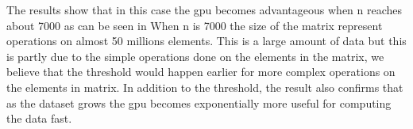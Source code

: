 The results show that in this case the \acrshort{gpu} becomes advantageous when n reaches about 7000 as can be seen in 
When n is 7000 the size of the matrix represent operations on almost 50 millions elements.
This is a large amount of data but this is partly due to the simple operations done on the elements in the matrix, we believe that the threshold would happen earlier for more complex operations on the elements in matrix.
In addition to the threshold, the result also confirms that as the dataset grows the \acrshort{gpu} becomes exponentially more useful for computing the data fast.
